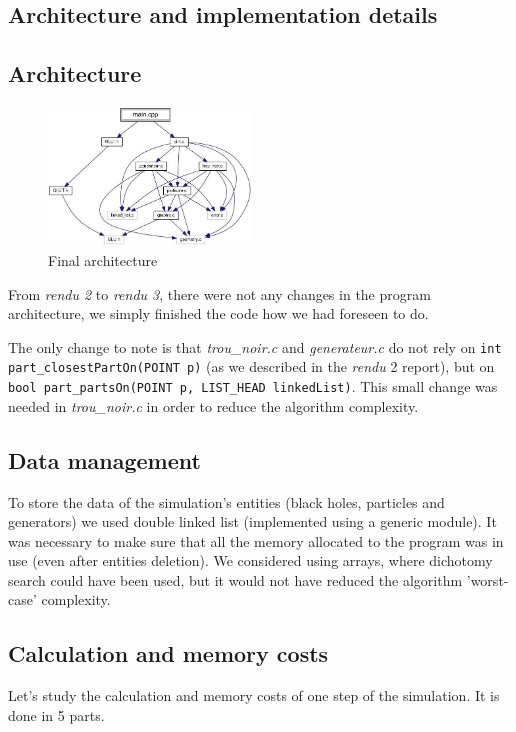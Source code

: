 \documentclass[a4paper]{article} %
\begin{document}
\begin{multicols*}{2}
\section{Architecture and implementation details}

\subsection{Architecture}
\begin{figure}[H]
\centering
\includegraphics[width=0.48\textwidth]{architecture.jpg}
\caption{Final architecture}
\end{figure}

From \emph{rendu 2} to \emph{rendu 3}, there were not any changes in the
program architecture, we simply finished the code how we had foreseen to do.

The only change to note is that \emph{trou\_noir.c} and \emph{generateur.c} do not rely on \texttt{int part\_closestPartOn(POINT p)}
(as we described in the \emph{rendu }2 report), but on \texttt{bool part\_partsOn(POINT p, LIST\_HEAD linkedList)}.
This small change was needed in \emph{trou\_noir.c} in order to reduce the algorithm complexity.

\subsection{Data management}
To store the data of the simulation's entities (black holes, particles and generators)
we used double linked list (implemented using a generic module).
It was necessary to make sure that all the memory allocated to the program was in use (even after entities deletion).
We considered using arrays, where dichotomy search could have been used, but it would not have reduced the algorithm 'worst-case' complexity.

\subsection{Calculation and memory costs}
Let's study the calculation and memory costs of one step of the simulation.
It is done in 5 parts.


\end{multicols*}
\end{document}
